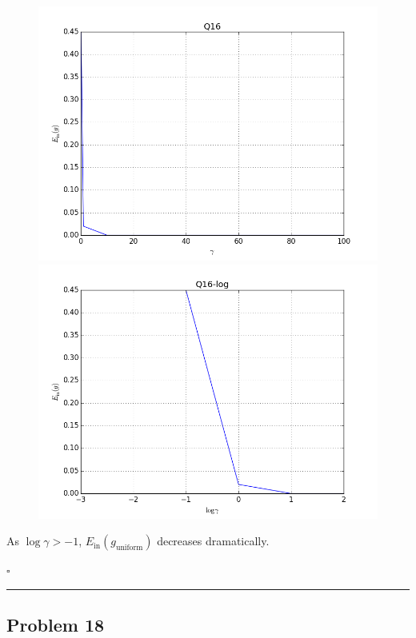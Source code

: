 \documentclass[12pt]{article}
\newcommand*{\QEDB}{\hfill\ensuremath{\square}}
\newcommand{\ParTh}[1]{\left(#1\right)}
\newcommand{\horrule}[1]{\rule{\linewidth}{#1}}
\begin{document}
\begin{figure}[H]
	\centering
	\includegraphics[scale=0.5]{Q16.png}
	\includegraphics[scale=0.5]{Q16-log.png}
\end{figure}
As $\log\gamma>-1$, $E_{\text{in}}\ParTh{g_{\text{uniform}}}$ decreases dramatically.

\QEDB

\horrule{0.5pt}

\subsection*{Problem 18}
\end{document}
